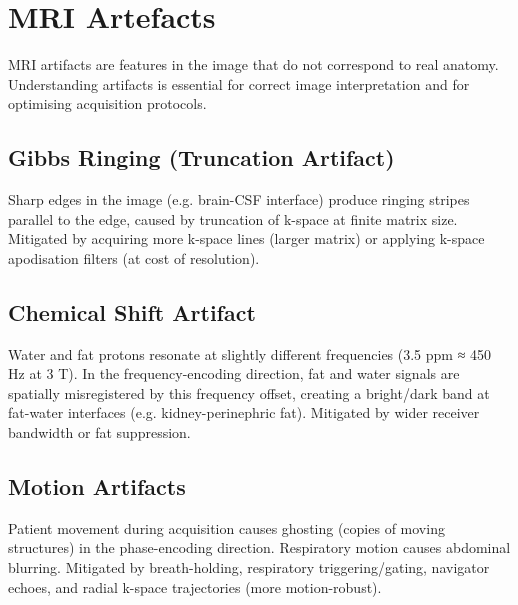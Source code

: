 \section{MRI Artefacts}\label{sec:wiki_mri_artifacts}



MRI artifacts are features in the image that do not correspond to real anatomy. Understanding artifacts is essential for correct image interpretation and for optimising acquisition protocols.

				

\subsection{Gibbs Ringing (Truncation Artifact)}

				

Sharp edges in the image (e.g. brain-CSF interface) produce ringing stripes parallel to the edge, caused by truncation of k-space at finite matrix size. Mitigated by acquiring more k-space lines (larger matrix) or applying k-space apodisation filters (at cost of resolution).


				

\subsection{Chemical Shift Artifact}

				

Water and fat protons resonate at slightly different frequencies (3.5 ppm ≈ 450 Hz at 3 T). In the frequency-encoding direction, fat and water signals are spatially misregistered by this frequency offset, creating a bright/dark band at fat-water interfaces (e.g. kidney-perinephric fat). Mitigated by wider receiver bandwidth or fat suppression.

				

\subsection{Motion Artifacts}

				

Patient movement during acquisition causes ghosting (copies of moving structures) in the phase-encoding direction. Respiratory motion causes abdominal blurring. Mitigated by breath-holding, respiratory triggering/gating, navigator echoes, and radial k-space trajectories (more motion-robust).


